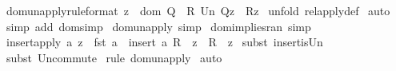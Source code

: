 \begin{isabellebody}
\isanewline
{}\isamarkupfalse%
\ dom{\isacharunderscore}un{\isacharunderscore}apply{\isacharbrackleft}rule{\isacharunderscore}format{\isacharbrackright}{\isacharcolon}\ {\isachardoublequoteopen}{\isacharparenleft}z\ {\isachartilde}{\isacharcolon}\ {\isacharparenleft}dom\ Q{\isacharparenright}{\isacharparenright}\ {\isacharminus}{\isacharminus}{\isachargreater}\ {\isacharparenleft}{\isacharparenleft}{\isacharparenleft}R\ Un\ Q{\isacharparenright}{\isacharpercent}{\isacharcircum}z{\isacharparenright}\ {\isacharequal}\ {\isacharparenleft}R{\isacharpercent}{\isacharcircum}z{\isacharparenright}{\isacharparenright}{\isachardoublequoteclose}\isanewline
%
\isadelimproof
%
\endisadelimproof
%
\isatagproof
{}\isamarkupfalse%
\ {\isacharparenleft}unfold\ rel{\isacharunderscore}apply{\isacharunderscore}def{\isacharparenright}\isanewline
{}\isamarkupfalse%
\ auto\isanewline
{}\isamarkupfalse%
\ {\isacharparenleft}simp\ add{\isacharcolon}\ dom{\isacharunderscore}simp{\isacharparenright}\isanewline
{}\isamarkupfalse%
%
\endisatagproof
{\isafoldproof}%
%
\isadelimproof
\isanewline
%
\endisadelimproof
{}\isamarkupfalse%
\ dom{\isacharunderscore}un{\isacharunderscore}apply\ {\isacharbrackleft}simp{\isacharbrackright}\isanewline
{}\isamarkupfalse%
\ dom{\isacharunderscore}implies{\isacharunderscore}ran\ {\isacharbrackleft}simp{\isacharbrackright}\isanewline
\isanewline
\isanewline
{}\isamarkupfalse%
\ insert{\isacharunderscore}apply{\isacharcolon}\ {\isachardoublequoteopen}{\isacharbang}{\isacharbang}a{\isachardot}\ z\ {\isachartilde}{\isacharequal}\ fst\ a\ {\isacharequal}{\isacharequal}{\isachargreater}\ {\isacharparenleft}insert\ a\ R{\isacharparenright}\ {\isacharpercent}{\isacharcircum}\ z\ {\isacharequal}\ R\ {\isacharpercent}{\isacharcircum}\ z{\isachardoublequoteclose}\isanewline
%
\isadelimproof
%
\endisadelimproof
%
\isatagproof
{}\isamarkupfalse%
\ {\isacharparenleft}subst\ insert{\isacharunderscore}is{\isacharunderscore}Un{\isacharparenright}\isanewline
{}\isamarkupfalse%
\ {\isacharparenleft}subst\ Un{\isacharunderscore}commute{\isacharparenright}\isanewline
{}\isamarkupfalse%
\ {\isacharparenleft}rule\ dom{\isacharunderscore}un{\isacharunderscore}apply{\isacharparenright}\isanewline
{}\isamarkupfalse%
\ auto\isanewline
{}\isamarkupfalse%
%
\endisatagproof
{\isafoldproof}%
%
\isadelimproof
\isanewline
%
\endisadelimproof
\isanewline
{}\isamarkupfalse%

\end{isabellebody}
